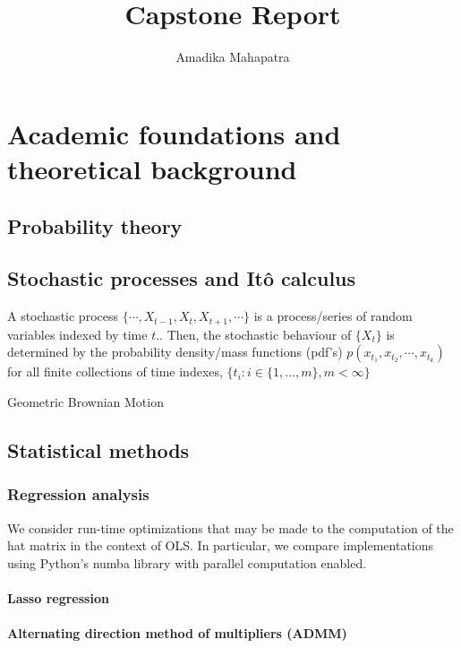 \documentclass[12pt,a4paper]{cibb}
\title{\Large $\ $\\ \bf Capstone Report}
\author{\large Amadika Mahapatra}
\begin{document}
\maketitle

\tableofcontents

\raggedright

\section{\bf Academic foundations and theoretical background}
\subsection{\textbf{Probability theory}}

\subsection{\textbf{Stochastic processes and Itô calculus}}
A stochastic process $\{\cdots, X_{t-1}, X_{t}, X_{t+1}, \cdots  \}$ is a process/series of random variables indexed by time $t$.. Then, the  stochastic behaviour of $\{X_t\}$ is determined by the probability density/mass functions (pdf's) $p(x_{t_1}, x_{t_2}, \cdots, x_{t_k}) $ for all finite collections of time indexes, $\{t_i: i \in \{1, ..., m \}, m < \infty \}$

Geometric Brownian Motion 


\subsection{\textbf{Statistical methods}}
\subsubsection{Regression analysis}
We consider run-time optimizations that may be made to the computation of the hat matrix in the context of OLS. In particular, we compare implementations using Python's numba library with parallel computation enabled.

\paragraph{\textbf{Lasso regression}}

\paragraph{Alternating direction method of multipliers (ADMM)}
\end{document}
